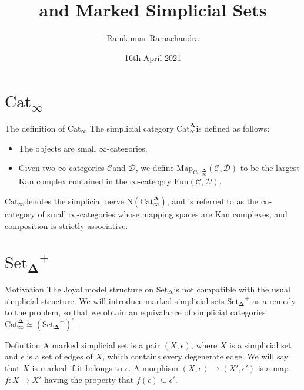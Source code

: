 \documentclass{beamer}[9pt]
\title{\texorpdfstring{\Catinf}{Cat∞} and Marked Simplicial Sets}
\author{Ramkumar Ramachandra}
\date{16th April 2021}
\institute{Université de Paris}
\newcommand{\8}{\ensuremath{\infty}}
\newcommand{\C}{\ensuremath{\mathscr{C}}}
\newcommand{\D}{\ensuremath{\mathscr{D}}}
\newcommand{\SSet}{\ensuremath{\text{Set}_{\boldsymbol{\Delta}}}}
\newcommand{\Catinfdel}{\ensuremath{\text{Cat}^{\boldsymbol{\Delta}}_{\infty}}}
\newcommand{\Catinf}{\ensuremath{\text{Cat}_{\infty}}}
\newcommand{\Map}{\ensuremath{\text{Map}}}
\newcommand{\Fun}{\ensuremath{\text{Fun}}}
\begin{document}
\begin{frame}
  \titlepage
\end{frame}

\section{\texorpdfstring{\Catinf}{Cat∞}}

\begin{frame}{The definition of \texorpdfstring{\Catinf}{Cat∞}}
  The simplicial category \Catinfdel is defined as follows:
  \begin{itemize}
    \item The objects are small \8-categories.
    \item Given two \8-categories \C and \D, we define $\Map_{\Catinfdel}(\C, \D)$ to be the largest Kan complex contained in the \8-cateogry $\Fun(\C, \D)$.
  \end{itemize}

  \Catinf denotes the simplicial nerve $\text{N}(\Catinfdel)$, and is referred to as the \8-category of small \8-categories whose mapping spaces are Kan complexes, and composition is strictly associative.
\end{frame}

\section{\texorpdfstring{$\SSet^+$}{Marked simplicial sets}}

\begin{frame}{Motivation}
  The Joyal model structure on \SSet is not compatible with the usual simplicial structure. We will introduce marked simplicial sets $\SSet^+$ as a remedy to the problem, so that we obtain an equivalance of simplicial categories $\Catinfdel \simeq (\SSet^+)^\circ$.
\end{frame}

\begin{frame}{Definition}
  A marked simplicial set is a pair $(X, \epsilon)$, where $X$ is a simplicial set and $\epsilon$ is a set of edges of $X$, which contains every degenerate edge. We will say that $X$ is marked if it belongs to $\epsilon$. A morphism $(X, \epsilon) \rightarrow (X', \epsilon')$ is a map $f : X \rightarrow X'$ having the property that $f(\epsilon) \subseteq \epsilon'$.
\end{frame}
\end{document}
